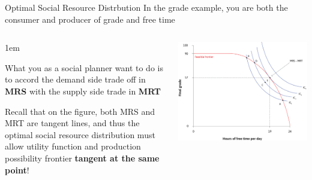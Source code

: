 \documentclass[11pt,aspectratio=43,usenames,dvipsnames]{beamer}
\let\olditemize=\itemize
\let\endolditemize=\enditemize
\renewenvironment{itemize}{\olditemize \itemsep1em}{\endolditemize}
\theoremstyle{definition}
\begin{document}
\begin{frame}{Optimal Social Resource Distrbution}
\label{slide:Constrained_Choice_Problem}
    \small
    In the grade example, you are both the \alert{consumer} and \alert{producer} of grade and free time
    \begin{columns}
        \begin{column}{0.5\textwidth}
            \begin{itemize}
                \item What you as a \alert{social planner} want to do is to accord the \alert{demand side} trade off in \textbf{MRS} with the \alert{supply side} trade in \textbf{MRT}
                \item Recall that on the figure, both MRS and MRT are \alert{tangent lines}, and thus the \alert{optimal social resource distribution} must allow utility function and production possibility frontier \textbf{tangent at the same point}!
            \end{itemize}
        \end{column}
        \begin{column}{0.5\textwidth}
            \includegraphics[width=\textwidth]{./figures/MRSMRT.png}
        \end{column}
    \end{columns}

\end{frame}
\end{document}
